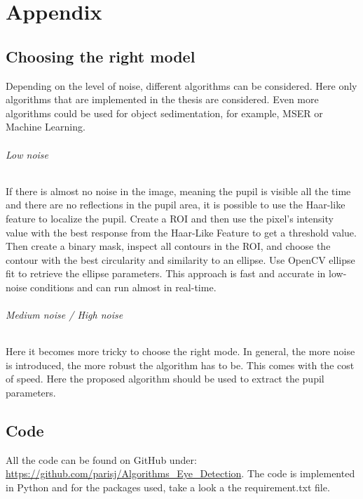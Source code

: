 \chapter{Appendix}
\label{appendix}
\section{Choosing the right model}
Depending on the level of noise, different algorithms can be considered. Here only algorithms that are implemented in the thesis are considered. Even more algorithms could be used for object sedimentation, for example, MSER or Machine Learning. 
\subparagraph{Low noise}
If there is almost no noise in the image, meaning the pupil is visible all the time and there are no reflections in the pupil area, it is possible to use the Haar-like feature to localize the pupil. Create a ROI and then use the pixel's intensity value with the best response from the Haar-Like Feature to get a threshold value. Then create a binary mask, inspect all contours in the ROI, and choose the contour with the best circularity and similarity to an ellipse. Use OpenCV ellipse fit to retrieve the ellipse parameters. This approach is fast and accurate in low-noise conditions and can run almost in real-time. 
\subparagraph{Medium noise / High noise}
Here it becomes more tricky to choose the right mode. In general, the more noise is introduced, the more robust the algorithm has to be. This comes with the cost of speed. Here the proposed algorithm should be used to extract the pupil parameters. 

\section{Code}
All the code can be found on GitHub under: \url{https://github.com/parisj/Algorithms_Eye_Detection}. The code is implemented in Python and for the packages used, take a look a the requirement.txt file.